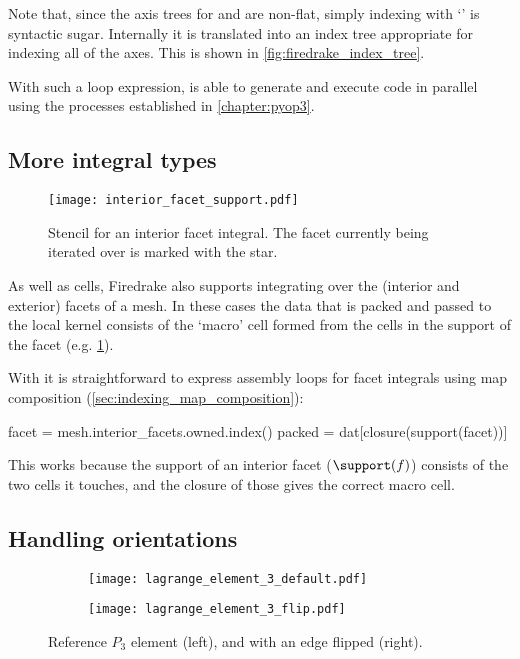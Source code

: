 \documentclass[thesis]{subfiles}
\begin{document}
Note that, since the axis trees for  and  are non-flat, simply indexing with `' is syntactic sugar.
Internally it is translated into an index tree appropriate for indexing all of the axes.
This is shown in \cref{fig:firedrake_index_tree}.

With such a loop expression,  is able to generate and execute code in parallel using the processes established in \cref{chapter:pyop3}.

\subsection{More integral types}
\label{sec:firedrake_facet_integration}

\begin{figure}
  \centering
  \texttt{[image: interior\_facet\_support.pdf]}
  \caption{
    Stencil for an interior facet integral.
    The facet currently being iterated over is marked with the star.
  }
  \label{fig:interior_facet_support}
\end{figure}

As well as cells, Firedrake also supports integrating over the (interior and exterior) facets of a mesh.
In these cases the data that is packed and passed to the local kernel consists of the `macro' cell formed from the cells in the support of the facet (e.g. \cref{fig:interior_facet_support}).

With  it is straightforward to express assembly loops for facet integrals using map composition (\cref{sec:indexing_map_composition}):
\begin{pyinline}
  facet = mesh.interior_facets.owned.index()
  packed = dat[closure(support(facet))]
\end{pyinline}
This works because the support of an interior facet ($\support(f)$) consists of the two cells it touches, and the closure of those gives the correct macro cell.

\subsection{Handling orientations}
\label{sec:firedrake_orientations}

\begin{figure}
  \centering
  \begin{subfigure}{0.45\textwidth}
    \centering
    \texttt{[image: lagrange\_element\_3\_default.pdf]}
  \end{subfigure}
  \begin{subfigure}{0.45\textwidth}
    \centering
    \texttt{[image: lagrange\_element\_3\_flip.pdf]}
  \end{subfigure}
  \caption{Reference $P_3$ element (left), and with an edge flipped (right).}
  \label{fig:element_orientation_permute}
\end{figure}
\end{document}
